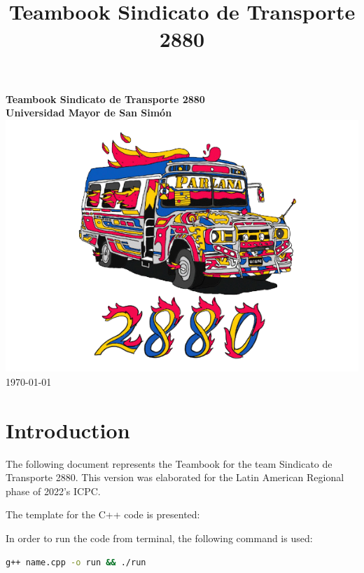 \documentclass[landscape,twocolumn, 7pt, letterpaper]{book}
\begin{document}
\title{Teambook Sindicato de Transporte 2880}
\begin{titlepage}
  \centering
  \vfill
  {\bfseries\Huge
  Teambook Sindicato de Transporte 2880\\
  \vspace{2cm}
  Universidad Mayor de San Simón\\
  }    
  \vfill
  \includegraphics[width=14cm]{../Figures/LogoSdT2880.png} %
  \vfill
  \LARGE{\today}
\end{titlepage}

\tableofcontents

\chapter{Introduction}

The following document represents the Teambook for the team Sindicato de Transporte 2880. This version was elaborated for the Latin American Regional phase of 2022's ICPC.

The template for the C++ code is presented:



In order to run the code from terminal, the following command is used:

\begin{Large}
  \begin{lstlisting}[language=bash]
    g++ name.cpp -o run && ./run
    \end{lstlisting}  
\end{Large}
\end{document}
